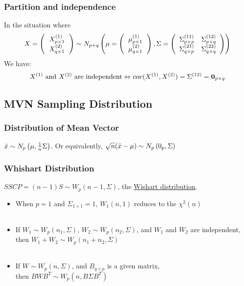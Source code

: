 \documentclass[12pt]{extarticle}
\newcommand{\<}{\langle}
\renewcommand{\>}{\rangle}
\theoremstyle{definition}
\begin{document}
\subsubsection{Partition and independence}
In the situation where
\begin{eqnarray*}
X=
\left( \begin{tabular}{l} 
        $X^{(1)}_{p \times 1}$\\ 
        $X^{(2)}_{q \times 1}$
        \end{tabular}\right)
\sim N_{p+q} \left(
        \mu = \left( \begin{tabular}{l} 
            $\mu^{(1)}_{p \times 1}$\\ 
            $\mu^{(2)}_{q \times 1}$
        \end{tabular}\right),
        \Sigma = \left(\begin{array}{cc}
            \Sigma^{(11)}_{p \times p} & \Sigma^{(12)}_{p \times q} \\
            \Sigma^{(21)}_{q \times p} & \Sigma^{(22)}_{q \times q}
        \end{array} \right)
    \right)
\end{eqnarray*}
We have: \\
\begin{eqnarray*}
\text{$X^{(1)}$ and $X^{(2)}$ are independent} \Leftrightarrow cov(X^{(1)},X^{(2)}) = \Sigma^{(12)} = {\bf 0}_{p \times q}
\end{eqnarray*}

\subsection{MVN Sampling Distribution}
\subsubsection{Distribution of Mean Vector}
$\Bar{x} \sim N_p\left(\mu, \frac{1}{n}\Sigma \right)$. Or equivalently, $\sqrt{n}(\Bar{x}-\mu) \sim N_p \left(0_p, \Sigma \right)$

\subsubsection{Whishart Distribution}
$SSCP = (n-1)S \sim W_p(n-1, \Sigma)$, the \underline{Wishart distribution}.
\begin{itemize}
    \item When $p=1$ and $\Sigma_{1 \times 1}=1$, $W_1(n,1)$ reduces to the $\chi^2 (n)$ \\ \ \\
    \item If $W_1 \sim W_p(n_1, \Sigma)$, $W_2 \sim W_p(n_2, \Sigma)$, and $W_1$ and $W_2$ are independent, \\
    then $W_1 + W_2 \sim W_p(n_1 + n_2, \Sigma)$ \\ \ \\
        \item If $W \sim W_p(n,\Sigma)$, and $B_{q \times p}$ is a given matrix, \\
    then $BWB^T \sim W_p (n, B\Sigma B^T)$
\end{itemize}
\end{document}
